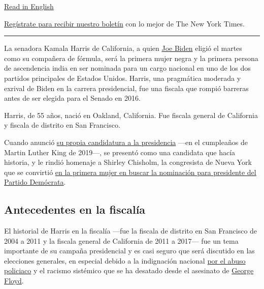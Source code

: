 \href{https://www.nytimes3xbfgragh.onion/2020/08/11/us/politics/kamala-bio.html}{Read
in English}

\href{https://www.nytimes3xbfgragh.onion/newsletters/el-times}{Regístrate
para recibir nuestro boletín} con lo mejor de The New York Times.

\begin{center}\rule{0.5\linewidth}{\linethickness}\end{center}

La senadora Kamala Harris de California, a quien
\href{https://www.nytimes3xbfgragh.onion/es/interactive/2020/espanol/estados-unidos/joe-biden-elecciones.html}{Joe
Biden} eligió el martes como su compañera de fórmula, será la primera
mujer negra y la primera persona de ascendencia india en ser nominada
para un cargo nacional en uno de los dos partidos principales de Estados
Unidos. Harris, una pragmática moderada y exrival de Biden en la carrera
presidencial, fue una fiscala que rompió barreras antes de ser elegida
para el Senado en 2016.

Harris, de 55 años, nació en Oakland, California. Fue fiscala general de
California y fiscala de distrito en San Francisco.

Cuando anunció
\href{https://www.nytimes3xbfgragh.onion/2019/01/21/us/politics/kamala-harris-2020-president.html}{su
propia candidatura a la presidencia} ---en el cumpleaños de Martin
Luther King de 2019---, se presentó como una candidata que hacía
historia, y le rindió homenaje a Shirley Chisholm, la congresista de
Nueva York que se convirtió
\href{https://www.nytimes3xbfgragh.onion/2005/01/03/obituaries/shirley-chisholm-unbossedpioneer-in-congress-is-dead-at-80.html}{en
la primera mujer en buscar la nominación para presidente del Partido
Demócrata}.

\hypertarget{antecedentes-en-la-fiscaluxeda}{%
\subsection{Antecedentes en la
fiscalía}\label{antecedentes-en-la-fiscaluxeda}}

El historial de Harris en la fiscalía ---fue la fiscala de distrito en
San Francisco de 2004 a 2011 y la fiscala general de California de 2011
a 2017--- fue un tema importante de su campaña presidencial y es casi
seguro que será discutido en las elecciones generales, en especial
debido a la indignación nacional
\href{https://www.nytimes3xbfgragh.onion/es/2020/06/13/espanol/mundo/protestas-violencia-policial.html}{por
el abuso policiaco} y el racismo sistémico que se ha desatado desde el
asesinato de
\href{https://www.nytimes3xbfgragh.onion/es/2020/06/09/espanol/mundo/George-Floyd-quien-es.html}{George
Floyd}.

